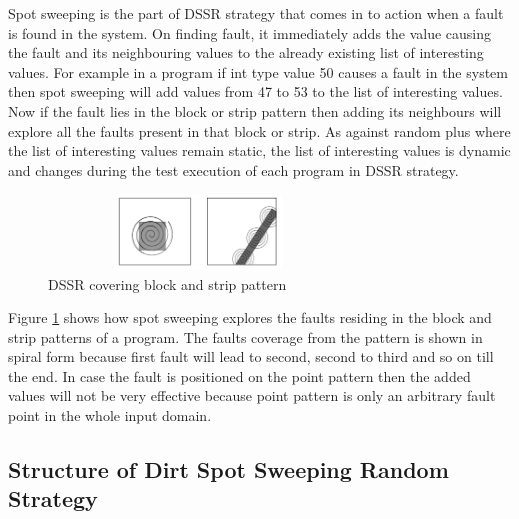 \documentclass[conference]{IEEEtran}
\begin{document}
Spot sweeping is the part of DSSR strategy that comes in to action when a fault is found in the system. On finding fault, it immediately adds the value causing the fault and its neighbouring values to the already existing list of interesting values. For example in a program if int type value 50 causes a fault in the system then spot sweeping will add values from 47 to 53 to the list of interesting values. Now if the fault lies in the block or strip pattern then adding its neighbours will explore all the faults present in that block or strip. As against random plus where the list of interesting values remain static, the list of interesting values is dynamic and changes during the test execution of each program in DSSR strategy.\\

\begin{figure}[ht]
\centering
\includegraphics[width=8cm,height=2cm]{block2.png}
\caption{DSSR covering block and strip pattern}
\label{fig:block2}
\end{figure}

Figure \ref{fig:block2} shows how spot sweeping explores the faults residing in the block and strip patterns of a program. The faults coverage from the pattern is shown in spiral form because first fault will lead to second, second to third and so on till the end. In case the fault is positioned on the point pattern then the added values will not be very effective because point pattern is only an arbitrary fault point in the whole input domain.

\subsection{Structure of Dirt Spot Sweeping Random Strategy}
\end{document}
